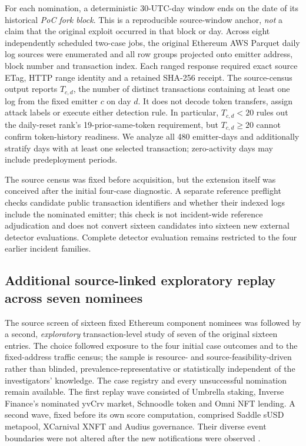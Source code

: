 \documentclass[preprint,12pt,authoryear]{elsarticle}
\begin{document}
For each nomination, a deterministic 30-UTC-day window ends on the date of its historical \emph{PoC fork block}. This is a reproducible source-window anchor, \emph{not} a claim that the original exploit occurred in that block or day. Across eight independently scheduled two-case jobs, the original Ethereum AWS Parquet daily log sources were enumerated and all row groups projected onto emitter address, block number and transaction index. Each ranged response required exact source ETag, HTTP range identity and a retained SHA-256 receipt. The source-census output reports $T_{c,d}$, the number of distinct transactions containing at least one log from the fixed emitter $c$ on day $d$. It does not decode token transfers, assign attack labels or execute either detection rule. In particular, $T_{c,d}<20$ rules out the daily-reset rank's 19-prior-same-token requirement, but $T_{c,d}\geq20$ cannot confirm token-history readiness. We analyze all 480 emitter-days and additionally stratify days with at least one selected transaction; zero-activity days may include predeployment periods.

The source census was fixed before acquisition, but the extension itself was conceived after the initial four-case diagnostic. A separate reference preflight checks candidate public transaction identifiers and whether their indexed logs include the nominated emitter; this check is not incident-wide reference adjudication and does not convert sixteen candidates into sixteen new external detector evaluations. Complete detector evaluation remains restricted to the four earlier incident families.

\subsection{Additional source-linked exploratory replay across seven nominees}
The source screen of sixteen fixed Ethereum component nominees was followed by a second, \emph{exploratory} transaction-level study of seven of the original sixteen entries. The choice followed exposure to the four initial case outcomes and to the fixed-address traffic census; the sample is resource- and source-feasibility-driven rather than blinded, prevalence-representative or statistically independent of the investigators' knowledge. The case registry and every unsuccessful nomination remain available. The first replay wave consisted of Umbrella staking, Inverse Finance's nominated yvCrv market, Schnoodle token and Omni NFT lending. A second wave, fixed before its own score computation, comprised Saddle sUSD metapool, XCarnival XNFT and Audius governance. Their diverse event boundaries were not altered after the new notifications were observed \citep{Umbrella2022Report,BlockSec2022Inverse,Schnoodle2022Analysis,SlowMist2023Omni,BlockSec2022Saddle,XCarnival2022Account,Audius2022Report}.
\end{document}
